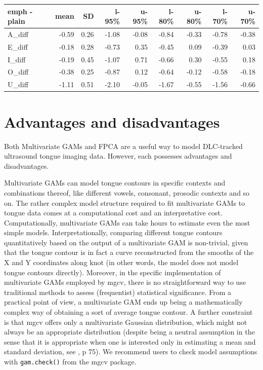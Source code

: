 \documentclass[
  man,
  longtable,
  nolmodern,
  notxfonts,
  notimes,
  colorlinks=true,linkcolor=blue,citecolor=blue,urlcolor=blue]{apa7}
\begin{document}
\begin{table}

{\caption{{Posterior difference of emphatic vs plain in each vowel
context.}{\label{tbl-emph-bm}}}
\vspace{-20pt}}

\begin{longtable}[]{@{}lrrrrrrrr@{}}
\toprule\noalign{}
emph - plain & mean & SD & l-95\% & u-95\% & l-80\% & u-80\% & l-70\% &
u-70\% \\
\midrule\noalign{}
\endhead
\bottomrule\noalign{}
\endlastfoot
A\_diff & -0.59 & 0.26 & -1.08 & -0.08 & -0.84 & -0.33 & -0.78 &
-0.38 \\
E\_diff & -0.18 & 0.28 & -0.73 & 0.35 & -0.45 & 0.09 & -0.39 & 0.03 \\
I\_diff & -0.19 & 0.45 & -1.07 & 0.71 & -0.66 & 0.30 & -0.55 & 0.18 \\
O\_diff & -0.38 & 0.25 & -0.87 & 0.12 & -0.64 & -0.12 & -0.58 & -0.18 \\
U\_diff & -1.11 & 0.51 & -2.10 & -0.05 & -1.67 & -0.55 & -1.56 &
-0.66 \\
\end{longtable}

\end{table}

\section{Advantages and disadvantages}\label{sec-procons}

Both Multivariate GAMs and FPCA are a useful way to model DLC-tracked
ultrasound tongue imaging data. However, each possesses advantages and
disadvantages.

Multivariate GAMs can model tongue contours in specific contexts and
combinations thereof, like different vowels, consonant, prosodic
contexts and so on. The rather complex model structure required to fit
multivariate GAMs to tongue data comes at a computational cost and an
interpretative cost. Computationally, multivariate GAMs can take hours
to estimate even the most simple models. Interpretationally, comparing
different tongue contours quantitatively based on the output of a
multivariate GAM is non-trivial, given that the tongue contour is in
fact a curve reconstructed from the smooths of the X and Y coordinates
along knot (in other words, the model does not model tongue contours
directly). Moreover, in the specific implementation of multivariate GAMs
employed by mgcv, there is no straightforward way to use traditional
methods to assess (frequentist) statistical significance. From a
practical point of view, a multivariate GAM ends up being a
mathematically complex way of obtaining a sort of average tongue
contour. A further constraint is that mgcv offers only a multivariate
Gaussian distribution, which might not always be an appropriate
distribution (despite being a neutral assumption in the sense that it is
appropriate when one is interested only in estimating a mean and
standard deviation, see , p
75). We recommend users to check model assumptions with
\texttt{gam.check()} from the mgcv package.
\end{document}
